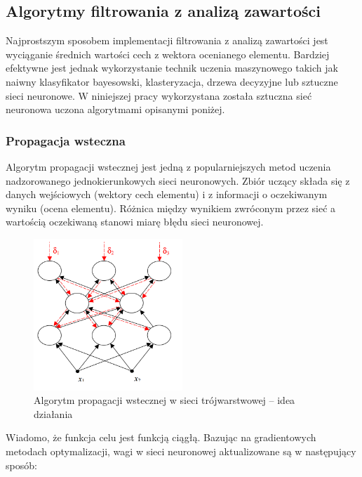 \documentclass[twoside]{iisthesis}
\begin{document}
	 \subsection{Algorytmy filtrowania z analizą zawartości}
	 
	 Najprostszym sposobem implementacji filtrowania z analizą zawartości jest wyciąganie średnich wartości cech z wektora ocenianego elementu. Bardziej efektywne jest jednak wykorzystanie technik uczenia maszynowego takich jak naiwny klasyfikator bayesowski, klasteryzacja, drzewa decyzyjne lub sztuczne sieci neuronowe. W niniejszej pracy wykorzystana została sztuczna sieć neuronowa uczona algorytmami opisanymi poniżej. 
	 
	 \subsubsection{Propagacja wsteczna}
	 \label{sss:backprop}
	 
	 Algorytm propagacji wstecznej jest jedną z popularniejszych metod uczenia nadzorowanego jednokierunkowych sieci neuronowych. Zbiór uczący składa się z danych wejściowych (wektory cech elementu) i z informacji o oczekiwanym wyniku (ocena elementu). Różnica między wynikiem zwróconym przez sieć a wartością oczekiwaną stanowi miarę błędu sieci neuronowej. 
	 
	 \begin{figure}[!ht] 
			 	\centering
			 	\includegraphics[width=0.5\textwidth]{ilustracjabackprop}
			 	\caption{Algorytm propagacji wstecznej w sieci trójwarstwowej -- idea działania \protect\cite{kwateralgorytmy}}
			 	\label{fig:ilustracjabackprop}
	 \end{figure}
	 
	 Wiadomo, że funkcja celu jest funkcją ciągłą. Bazując na gradientowych metodach optymalizacji, wagi w sieci neuronowej aktualizowane są w następujący sposób:	 
	 
\end{document}

